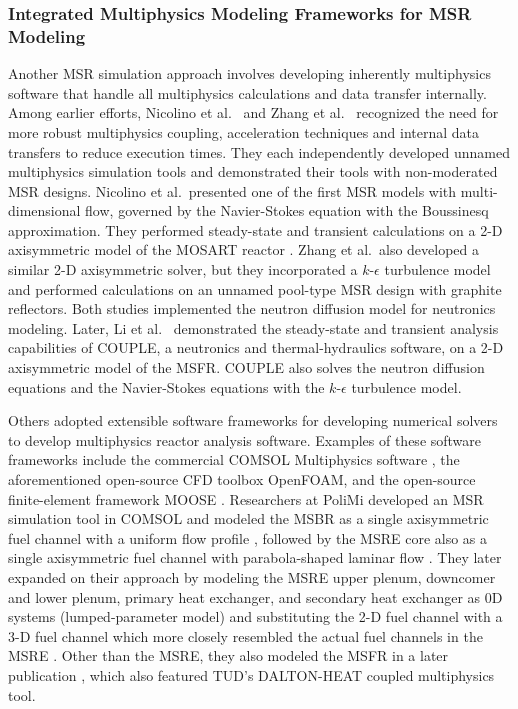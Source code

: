 \subsubsection{Integrated Multiphysics Modeling Frameworks for MSR Modeling}

Another \gls{MSR} simulation approach involves developing inherently multiphysics software that
handle all multiphysics calculations and data transfer internally. Among earlier efforts, Nicolino
et al.\ \cite{nicolino_coupled_2008} and Zhang et al.\ \cite{zhang_development_2009} recognized the
need for more robust multiphysics coupling, acceleration techniques and internal data transfers
to reduce execution times. They each independently developed unnamed multiphysics simulation tools
and demonstrated their tools with non-moderated \gls{MSR} designs. Nicolino et al.\ presented one
of the first \gls{MSR} models with multi-dimensional flow, governed by the Navier-Stokes equation
with the Boussinesq approximation. They performed steady-state and transient calculations on a 2-D
axisymmetric model of the \gls{MOSART} reactor \cite{ignatiev_molten_2014}. Zhang et al.\ also
developed a similar 2-D axisymmetric solver, but they incorporated a $k$-$\epsilon$ turbulence
model and performed calculations on an unnamed pool-type \gls{MSR} design with graphite reflectors.
Both studies implemented the neutron diffusion model for neutronics modeling.
Later, Li et al.\ \cite{li_transient_2015} demonstrated the
steady-state and transient analysis capabilities of COUPLE, a neutronics and
thermal-hydraulics software, on a 2-D axisymmetric model of the \gls{MSFR}. COUPLE also solves the
neutron diffusion equations and the Navier-Stokes equations with the $k$-$\epsilon$ turbulence
model.

Others adopted extensible software frameworks for developing numerical solvers
to develop multiphysics reactor analysis software. Examples of these software
frameworks include the commercial COMSOL
Multiphysics\textsuperscript{\textregistered} software
\cite{comsol_ab_comsol_nodate}, the aforementioned open-source CFD toolbox
OpenFOAM, and the open-source finite-element
framework \gls{MOOSE} \cite{giudicelli_30_2024}. Researchers at
\gls{PoliMi} developed an \gls{MSR} simulation tool in COMSOL and
modeled the \gls{MSBR} as a single axisymmetric fuel channel with a uniform
flow profile \cite{cammi_multi-physics_2011}, followed by the \gls{MSRE} core
also as a single axisymmetric fuel channel with parabola-shaped laminar flow
\cite{cammi_dimensional_2012}. They later expanded on their approach by
modeling the \gls{MSRE} upper plenum, downcomer and lower plenum, primary heat
exchanger, and secondary heat exchanger as 0D systems (lumped-parameter model)
and substituting the 2-D fuel channel with a 3-D fuel channel which more closely
resembled the actual fuel channels in the \gls{MSRE}
\cite{zanetti_geometric_2015}. Other than the \gls{MSRE}, they also modeled the
\gls{MSFR} in a later publication \cite{fiorina_modelling_2014}, which also featured \gls{TUD}'s
DALTON-HEAT coupled multiphysics tool.


